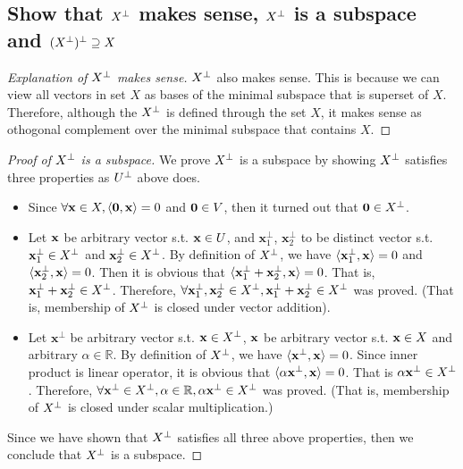 \documentclass[11pt,a4paper]{article}
\begin{document}
\newpage
\newcommand{\xtvec}{\mathbf{x}^{\perp}}
\subsection{Show that $X^{\perp}$ makes sense, $X^{\perp}$ is a subspace and
    $(X^{\perp})^{\perp} \supseteq X$}
\begin{proof}[Explanation of $X^{\perp}$ makes sense]
    $X^{\perp}$ also makes sense. This is because we can view all vectors in set $X$
    as bases of the minimal subspace that is superset of $X$. Therefore,
    although the $X^{\perp}$ is defined through the set $X$, it makes sense as
    othogonal complement over the minimal subspace that contains $X$.
\end{proof}
\begin{proof}[Proof of $X^{\perp}$ is a subspace]
    We prove $X^{\perp}$ is a subspace by showing $X^{\perp}$ satisfies three properties
    as $U^{\perp}$ above does. 
    \begin{itemize}
        \item Since $\forall \mathbf{x} \in X, \langle \mathbf{0}, \mathbf{x} \rangle = 0$
            and $\mathbf{0} \in V$, then it turned out that $\mathbf{0} \in X^{\perp}$.
        \item Let $\mathbf{x}$ be arbitrary vector s.t. $\mathbf{x} \in U$, and
            $\xtvec_1$, $\xtvec_2$ to be distinct vector s.t. $\xtvec_1 \in \Xt$
            and $\xtvec_2 \in \Xt$. By definition of $X^{\perp}$, we have 
            $\langle \xtvec_1, \xvec \rangle = 0$ and 
            $\langle \xtvec_2, \xvec \rangle = 0$. 
            Then it is obvious that 
            $\langle \xtvec_1 + \xtvec_2, \xvec \rangle = 0$. 
            That is, $\xtvec_1 +\xtvec_2 \in \Xt$.
            Therefore, $\forall \xtvec_1, \xtvec_2 \in \Xt,
            \xtvec_1+\xtvec_2 \in \Xt$ was proved. (That is, membership of
            $X^{\perp}$ is closed under vector addition).
        \item Let $\xtvec$ be arbitrary vector s.t. $\mathbf{x} \in X^{\perp}$, 
            $\mathbf{x}$ be arbitrary vector s.t. $\mathbf{x} \in X$ and
            arbitrary $\alpha \in \mathbb{R}$. By definition of $X^{\perp}$, we have 
            $\langle \xtvec, \xvec \rangle = 0$. 
            Since inner product is linear operator, it is obvious that
            $\langle \alpha \xtvec, \xvec \rangle = 0$. 
            That is $\alpha \xtvec \in \Xt$.
            Therefore, $\forall \xtvec \in \Xt, \alpha \in \mathbb{R}, \alpha
            \xtvec \in \Xt$ was proved. (That is, membership of $X^{\perp}$ is
            closed under scalar multiplication.)
    \end{itemize}
    Since we have shown that $X^{\perp}$ satisfies all three above properties, then
    we conclude that $X^{\perp}$ is a subspace.
\end{proof}
\end{document}

